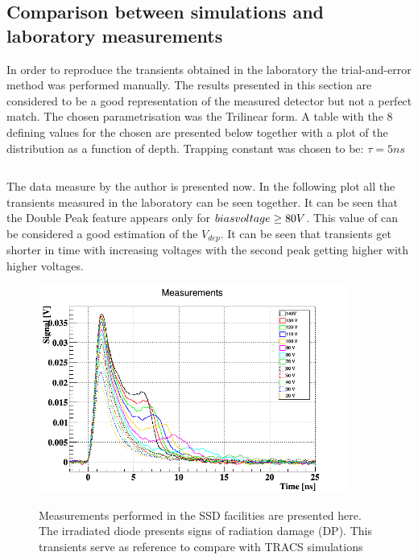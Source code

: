\subsection{Comparison between simulations and laboratory measurements}


In order to reproduce the transients obtained in the laboratory the trial-and-error method was performed manually. The results presented in this section are considered to be a good representation of the measured detector but not a perfect match. The chosen \neff parametrisation was the Trilinear form. A table with the 8 defining values for the chosen \neff are presented below together with a plot of the \neff distribution as a function of depth. Trapping constant was chosen to be: $\tau = 5 ns$

\begin{centering}
\begin{tabular}{c}
	

\end{tabular}
\end{centering}

The data measure by the author is presented now. In the following plot all the transients measured in the laboratory can be seen together. It can be seen that the Double Peak feature appears only for $bias voltage \geq 80 V$. This value of \vias can be considered a good estimation of the $V_{dep}$. It can be seen that transients get shorter in time with increasing voltages with the second peak getting higher with higher voltages. 

\begin{figure}[H]
	\centering
	\includegraphics[width=0.9\textwidth]{c1.png}
	\label{fig:mues2}
	\caption{Measurements performed in the SSD facilities are presented here. The irradiated diode presents signs of radiation damage (DP). This transients serve as reference to compare with TRACS simulations}
\end{figure}
				
